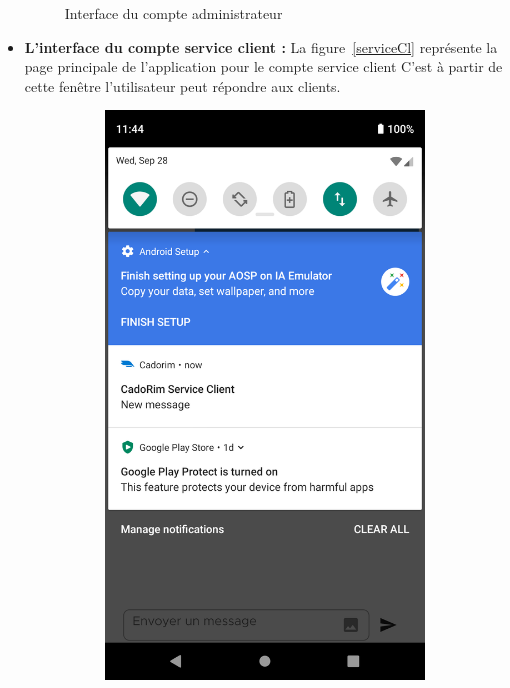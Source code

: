\begin{itemize}[label=$\ast$]
\begin{figure}
	\caption{Interface du compte administrateur
	}
	\label{Home}
\end{figure}
\newpage
\item \textbf{L’interface du compte service client
	:} 
La figure~\ref{serviceCl} représente la page principale de l’application pour le compte service client C’est à partir de cette fenêtre l'utilisateur peut répondre aux clients.
\begin{figure}
	\centering
	\begin{subfigure}{0.3\textwidth}
		\includegraphics[width=\hsize, valign=m ]{./Template LaTeX/Images/From_emu/a.png}

\end{subfigure}
\end{figure}
\end{itemize}
